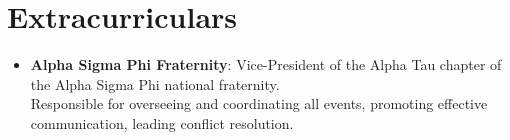 \documentclass[letterpaper,11pt]{article}
\newcommand{\resumeItem}[2]{
  \item\small{
    \textbf{#1}{: #2 \vspace{-2pt}}
  }
}
\newcommand{\resumeSubItem}[2]{\resumeItem{#1}{#2}\vspace{-4pt}}
\newcommand{\resumeItemListStart}{ \begin{itemize}[leftmargin=*] }
\newcommand{\resumeItemListEnd}{ \end{itemize} }
\begin{document}
\section{Extracurriculars}
  \resumeItemListStart
    \resumeSubItem{Alpha Sigma Phi Fraternity}
    {Vice-President of the Alpha Tau chapter of the Alpha Sigma Phi national fraternity. \\
    Responsible for overseeing and coordinating all events, promoting effective communication, leading conflict resolution.}
  \resumeItemListEnd
\end{document}
